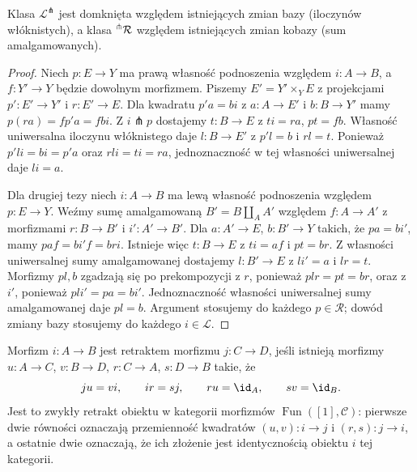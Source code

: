 \begin{stwierdzenie}\label{cat:prop:lifting-base-change}
Klasa $\mathcal L^\pitchfork$ jest domknięta względem istniejących zmian bazy (iloczynów włóknistych), a klasa $\vphantom{R}^\pitchfork\mathcal R$ względem istniejących zmian kobazy (sum amalgamowanych).
\end{stwierdzenie}
\begin{proof}
Niech $p:E\to Y$ ma prawą własność podnoszenia względem $i:A\to B$, a $f:Y'\to Y$ będzie dowolnym morfizmem. Piszemy $E'=Y'\times_Y E$ z projekcjami $p':E'\to Y'$ i $r:E'\to E$. Dla kwadratu $p'a=bi$ z $a:A\to E'$ i $b:B\to Y'$ mamy $p(ra)=fp'a=fbi$. Z $i\pitchfork p$ dostajemy $t:B\to E$ z $ti=ra$, $pt=fb$. Własność uniwersalna iloczynu włóknistego daje $l:B\to E'$ z $p'l=b$ i $rl=t$. Ponieważ $p'li=bi=p'a$ oraz $rli=ti=ra$, jednoznaczność w tej własności uniwersalnej daje $li=a$.

Dla drugiej tezy niech $i:A\to B$ ma lewą własność podnoszenia względem $p:E\to Y$. Weźmy sumę amalgamowaną $B'=B\amalg_A A'$ względem $f:A\to A'$ z morfizmami $r:B\to B'$ i $i':A'\to B'$. Dla $a:A'\to E$, $b:B'\to Y$ takich, że $pa=bi'$, mamy $paf=bi'f=bri$. Istnieje więc $t:B\to E$ z $ti=af$ i $pt=br$. Z własności uniwersalnej sumy amalgamowanej dostajemy $l:B'\to E$ z $li'=a$ i $lr=t$. Morfizmy $pl,b$ zgadzają się po prekompozycji z $r$, ponieważ $plr=pt=br$, oraz z $i'$, ponieważ $pli'=pa=bi'$. Jednoznaczność własności uniwersalnej sumy amalgamowanej daje $pl=b$. Argument stosujemy do każdego $p\in\mathcal R$; dowód zmiany bazy stosujemy do każdego $i\in\mathcal L$.
\end{proof}

\begin{definicja}\label{cat:def:arrow-retract}
Morfizm $i:A\to B$ jest retraktem morfizmu $j:C\to D$, jeśli istnieją morfizmy $u:A\to C$, $v:B\to D$, $r:C\to A$, $s:D\to B$ takie, że
\[
 ju=vi,\qquad ir=sj,\qquad ru=\id_A,\qquad sv=\id_B.
\]
Jest to zwykły retrakt obiektu w kategorii morfizmów $\operatorname{Fun}([1],\mathcal C)$: pierwsze dwie równości oznaczają przemienność kwadratów $(u,v):i\to j$ i $(r,s):j\to i$, a ostatnie dwie oznaczają, że ich złożenie jest identycznością obiektu $i$ tej kategorii.
\end{definicja}

